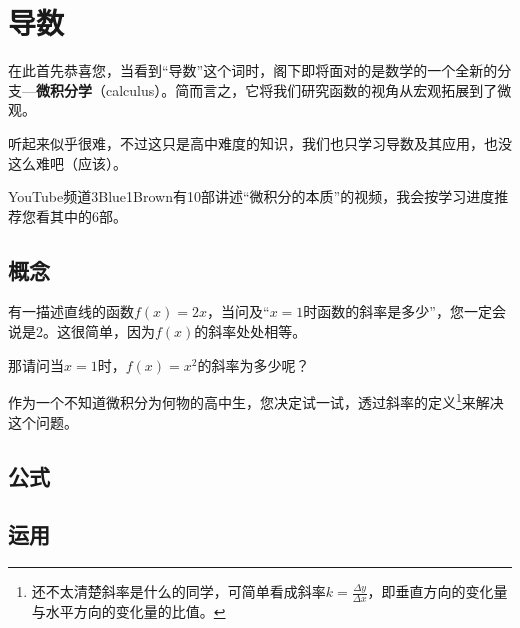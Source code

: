 \chapter{导数}
在此首先恭喜您，当看到“导数”这个词时，阁下即将面对的是数学的一个全新的分支---\textbf{微积分学}（calculus）。简而言之，它将我们研究函数的视角从宏观拓展到了微观。

听起来似乎很难，不过这只是高中难度的知识，我们也只学习导数及其应用，也没这么难吧（应该）。

YouTube频道3Blue1Brown有10部讲述“微积分的本质”的视频，我会按学习进度推荐您看其中的6部。

\section{概念}
有一描述直线的函数$f(x)=2x$，当问及“$x=1$时函数的斜率是多少”，您一定会说是2。这很简单，因为$f(x)$的斜率处处相等。

那请问当$x=1$时，$f(x)=x^2$的斜率为多少呢？

作为一个不知道微积分为何物的高中生，您决定试一试，透过斜率的定义\footnote{还不太清楚斜率是什么的同学，可简单看成斜率$k=\tfrac{\Delta y}{\Delta x}$，即垂直方向的变化量与水平方向的变化量的比值。}来解决这个问题。

\section{公式}
\section{运用}

